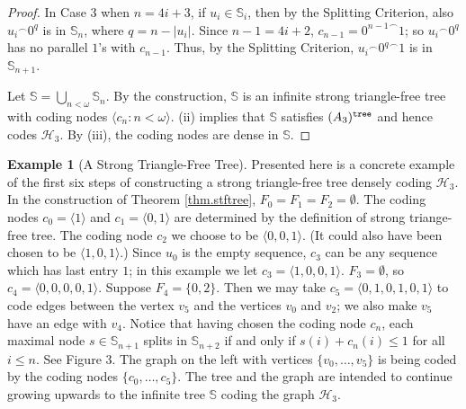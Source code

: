 \documentclass{amsart}
\theoremstyle{remark}
\theoremstyle{definition}
\newtheorem{example}[thm]{Example}
\theoremstyle{remark}
\newcommand{\om}{\omega}
\newcommand{\bS}{\mathbb{S}}
\newcommand{\lgl}{\langle}
\newcommand{\rgl}{\rangle}
\begin{document}
\begin{proof}
In
 Case 3 when $n=4i+3$, if  $u_i\in \bS_i$,
then by the Splitting Criterion, also
${u_i}^{\frown}0^q$ is in $\bS_n$,
where $q=n-|u_i|$.
Since $n-1=4i+2$,  $c_{n-1}={0^{n-1}}^{\frown}1$;
so ${u_i}^{\frown}0^q$ has no parallel $1$'s with $c_{n-1}$.
Thus, by the Splitting Criterion,
${u_i}^{\frown}{0^q}^{\frown}1$  is  in $\bS_{n+1}$.




Let $\bS=\bigcup_{n<\om}\bS_n$.
By  the construction, $\bS$  is an infinite  strong triangle-free tree with coding nodes $\lgl c_n:n<\om\rgl$.
(ii) implies that $\bS$ satisfies $(A_3)^{\tt tree}$ and hence codes $\mathcal{H}_3$.
By (iii), the coding nodes are dense in $\bS$.
\end{proof}



\begin{example}[A Strong Triangle-Free Tree]\label{ex.stft}
Presented here is a concrete example of the first six steps of constructing a strong triangle-free tree densely coding $\mathcal{H}_3$.
In the  construction of Theorem \ref{thm.stftree}, $F_0=F_1=F_2=\emptyset$.
 The coding nodes  $c_0=\lgl 1\rgl$ and $c_1=\lgl 0,1\rgl$ are determined by the definition of strong triange-free tree.
The coding node $c_2$ we choose to be $\lgl 0,0,1\rgl$.
(It could also have been  chosen to be $\lgl 1,0,1\rgl$.)
Since $u_0$ is the empty sequence,  $c_3$ can be any  sequence which has last entry $1$; in this example we let $c_3=\lgl 1,0,0,1\rgl$.
$F_3=\emptyset$, so $c_4=\lgl 0,0,0,0,1\rgl$.
Suppose $F_4=\{0,2\}$.
Then we may take $c_5=\lgl 0,1,0,1,0,1\rgl $ to code edges between the vertex $v_5$ and the vertices $v_0$ and $v_2$;
we also make $v_5$ have an edge with $v_4$.
Notice that having
chosen the coding node $c_n$,
each  maximal node $s\in\bS_{n+1}$
splits in $\bS_{n+2}$ if and only if
   $s(i)+c_n(i)\le 1$ for all $i\le n$.
See Figure 3.
The graph on the left with vertices $\{v_0,\dots,v_5\}$ is being coded by the coding nodes $\{c_0,\dots,c_5\}$.
The tree and the graph are intended to continue growing upwards to the infinite tree $\bS$ coding the graph $\mathcal{H}_3$.








\begin{figure}\label{fig.bS}
\begin{tikzpicture}[grow'=up,scale=.58]


\end{tikzpicture}
\end{figure}
\end{example}
\end{document}
